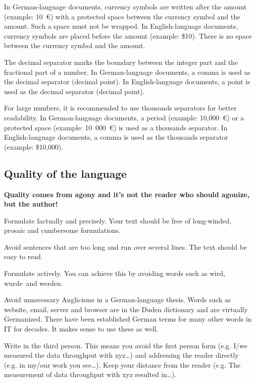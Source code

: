 \documentclass{llncs}
\begin{document}
In German-language documents, currency symbols are written after the amount (example: 10~\euro) with a protected space between the currency symbol and the amount. Such a space must not be wrapped. In English-language documents, currency symbols are placed before the amount (example: \$10). There is no space between the currency symbol and the amount.

The decimal separator marks the boundary between the integer part and the fractional part of a number. In German-language documents, a comma is used as the decimal separator (decimal point). In English-language documents, a point is used as the decimal separator (decimal point).

For large numbers, it is recommended to use thousands separators for better readability. In German-language documents, a period (example: 10,000~\euro) or a protected space (example: 10~000~\euro) is used as a thousands separator. In English-language documents, a comma is used as the thousands separator (example: \$10,000).

\subsection{Quality of the language}

\textbf{Quality comes from agony and it's not the reader who should agonize, but the author!}

Formulate factually and precisely. Your text should be free of long-winded, prosaic and cumbersome formulations.

Avoid sentences that are too long and run over several lines. The text should be easy to read.

Formulate actively. You can achieve this by avoiding words such as \glqq wird\grqq, \glqq wurde\grqq\ and \glqq werden\grqq.

Avoid unnecessary Anglicisms in a German-language thesis. Words such as website, email, server and browser are in the Duden dictionary and are virtually Germanized. There have been established German terms for many other words in IT for decades. It makes sense to use these as well.

Write in the third person. This means you avoid the first person form (e.g. \glqq I/we measured the data throughput with xyz\dots\grqq) and addressing the reader directly (e.g. \glqq in my/our work you see\dots\grqq). Keep your distance from the reader (e.g. \glqq The measurement of data throughput with xyz resulted in\dots\grqq).
\end{document}
